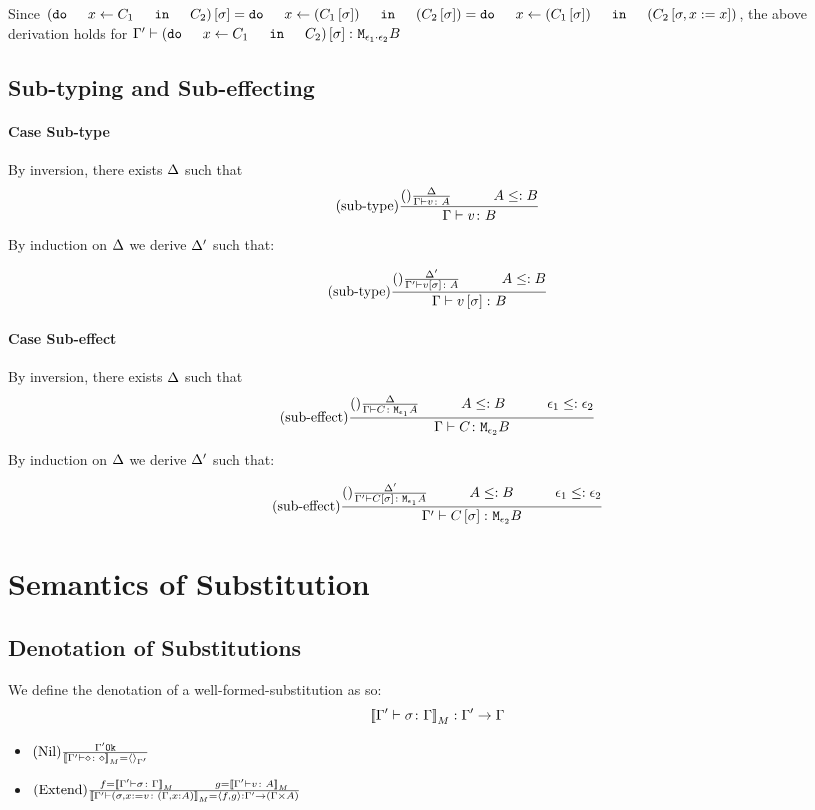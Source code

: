 \documentclass{report}
\begin{document}
    Since $(\doin{x}{C_1}{C_2})\ssi = \doin{x}{(C_1\ssi)}{(C_2\ssi)} = \doin{x}{(C_1\ssi)}{(C_2\sub{\si, x\setto x})}$, the above derivation holds for $\typerelation{\G'}{(\doin{x}{C_1}{C_2})\ssi}{\M{\e_1\dot\e_2}{B}}$
\subsection{Sub-typing and Sub-effecting}
\paragraph{Case Sub-type}
    By inversion, there exists $\Delta$ such that
    \begin{equation}
        \treerule{sub-type}{\treerule{}{\D}{\typerelation{\G}{v}{A}}\s\s A\subtype B}{\typerelation{\G}{v}{B}}
    \end{equation}

    By induction on $\Delta$ we derive $\Delta'$ such that:

    \begin{equation}
        \treerule{sub-type}{\treerule{}{\D'}{\typerelation{\G'}{v\ssi}{A}}\s\s A\subtype B}{\typerelation{\G}{v\ssi}{B}}
    \end{equation}
\paragraph{Case Sub-effect}
By inversion, there exists $\Delta$ such that
\begin{equation}
    \treerule{sub-effect}{\treerule{}{\D}{\typerelation{\G}{C}{\M{\e_1}{A}}}\s\s A\subtype B\s\s\e_1\subtype\e_2}{\typerelation{\G}{C}{\M{\e_2}{B}}}
\end{equation}

By induction on $\Delta$ we derive $\Delta'$ such that:

\begin{equation}
    \treerule{sub-effect}{\treerule{}{\D'}{\typerelation{\G'}{C\ssi}{\M{\e_1}{A}}}\s\s A\subtype B\s\s\e_1\subtype\e_2}{\typerelation{\G'}{C\ssi}{\M{\e_2}{B}}}
\end{equation}
\section{Semantics of Substitution}
\subsection{Denotation of Substitutions}
We define the denotation of a well-formed-substitution as so:
\begin{equation}
    {\bf [\![}\Gamma' \vdash \sigma \colon \Gamma{\bf ]\!]}_M: \Gamma' \rightarrow \Gamma
\end{equation}
\begin{itemize}
    \item $(\text{Nil}) \frac{\Gamma' \texttt{Ok}}{{\bf [\![}\Gamma' \vdash \diamond \colon \diamond{\bf ]\!]}_M = \left\langle\right\rangle_{\Gamma'}}$
    \item $\treerule{Extend}{f = \deno{\typerelation{\G'}{\si}{\G}}\s\s g= \deno{\typerelation{\G'}{v}{A}}}{\deno{\typerelation{\G'}{(\si, x\setto v}{(\gax)}} = \pr{f}{g}:\G' \rightarrow (\G\times A)}$
\end{itemize}
\end{document}
